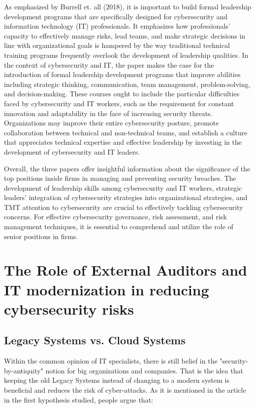 \documentclass[journal]{IEEEtran}
\begin{document}
As emphasized by Burrell et. all (2018), it is important to build formal leadership development programs that are specifically designed for cybersecurity and information technology (IT) professionals. It emphasizes how professionals' capacity to effectively manage risks, lead teams, and make strategic decisions in line with organizational goals is hampered by the way traditional technical training programs frequently overlook the development of leadership qualities. In the context of cybersecurity and IT, the paper makes the case for the introduction of formal leadership development programs that improve abilities including strategic thinking, communication, team management, problem-solving, and decision-making. These courses ought to include the particular difficulties faced by cybersecurity and IT workers, such as the requirement for constant innovation and adaptability in the face of increasing security threats. Organizations may improve their entire cybersecurity posture, promote collaboration between technical and non-technical teams, and establish a culture that appreciates technical expertise and effective leadership by investing in the development of cybersecurity and IT leaders.

Overall, the three papers offer insightful information about the significance of the top positions inside firms in managing and preventing security breaches. The development of leadership skills among cybersecurity and IT workers, strategic leaders' integration of cybersecurity strategies into organizational strategies, and TMT attention to cybersecurity are crucial to effectively tackling cybersecurity concerns. For effective cybersecurity governance, risk assessment, and risk management techniques, it is essential to comprehend and utilize the role of senior positions in firms.


\section{The Role of External Auditors and IT modernization in reducing cybersecurity risks}

\subsection{Legacy Systems vs. Cloud Systems}

Within the common opinion of IT specialists, there is still belief in the "security-by-antiquity" notion for big organizations and companies. That is the idea that keeping the old Legacy Systems instead of changing to a modern system is beneficial and reduces the risk of cyber-attacks. As it is mentioned in the article \cite{bastos_1} in the first hypothesis studied, people argue that: 
\end{document}
